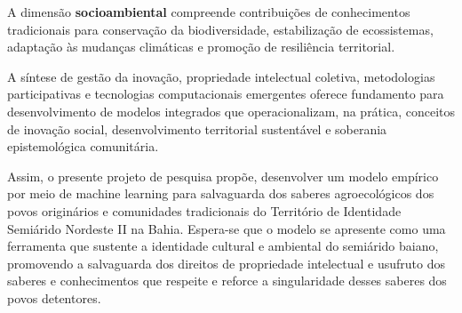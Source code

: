 A dimensão \textbf{socioambiental} compreende contribuições de conhecimentos tradicionais para conservação da biodiversidade, estabilização de ecossistemas, adaptação às mudanças climáticas e promoção de resiliência territorial.

A síntese de gestão da inovação, propriedade intelectual coletiva, metodologias participativas e tecnologias computacionais emergentes oferece fundamento para desenvolvimento de modelos integrados que operacionalizam, na prática, conceitos de inovação social, desenvolvimento territorial sustentável e soberania epistemológica comunitária.

Assim, o presente projeto de pesquisa propõe, desenvolver um modelo empírico por meio de machine learning para salvaguarda dos saberes agroecológicos dos povos originários e comunidades tradicionais do Território de Identidade Semiárido Nordeste II na Bahia. Espera-se que o modelo se apresente como uma ferramenta que sustente a identidade cultural e ambiental do semiárido baiano, promovendo a salvaguarda dos direitos de propriedade intelectual e usufruto dos saberes e conhecimentos que respeite e reforce a singularidade desses saberes dos povos detentores.



